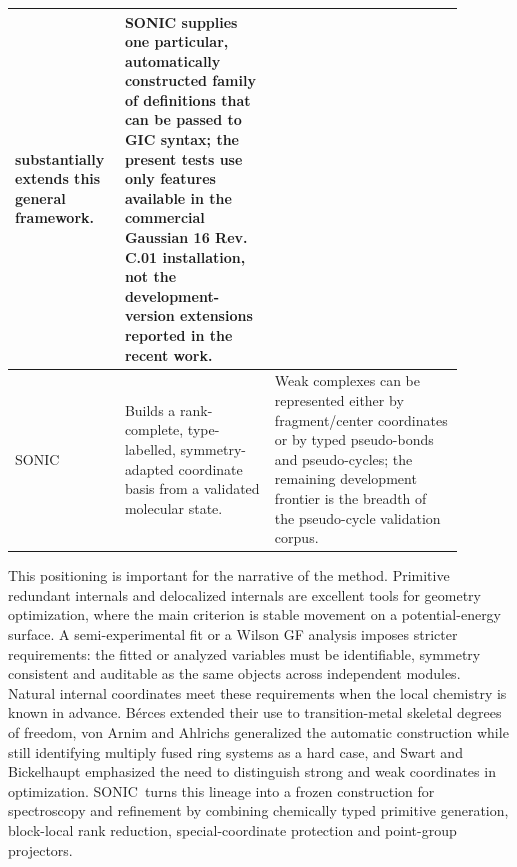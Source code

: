 \documentclass[journal=jctcce,manuscript=article,layout=traditional]{achemso}
\newcommand{\SONIC}{SONIC}
\theoremstyle{definition}
\begin{document}
\begin{table}[htbp]
\begin{tabular}{p{0.19\linewidth}p{0.31\linewidth}p{0.39\linewidth}}
substantially extends this general framework.\cite{Marenich2025GIC} & \SONIC{}
supplies one particular, automatically constructed family of definitions that
can be passed to GIC syntax; the present tests use only features available in
the commercial Gaussian 16 Rev. C.01 installation, not the development-version
extensions reported in the recent work. \\
\midrule
\SONIC & Builds a rank-complete, type-labelled, symmetry-adapted coordinate basis
from a validated molecular state. & Weak complexes can be represented either
by fragment/center coordinates or by typed pseudo-bonds and
pseudo-cycles; the remaining development frontier is the breadth of the
pseudo-cycle validation corpus. \\
\bottomrule
\end{tabular}
\end{table}

This positioning is important for the narrative of the method.  Primitive
redundant internals and delocalized internals are excellent tools for geometry
optimization, where the main criterion is stable movement on a potential-energy
surface.  A semi-experimental fit or a Wilson GF analysis imposes stricter
requirements: the fitted or analyzed variables must be identifiable, symmetry
consistent and auditable as the same objects across independent modules.
Natural internal coordinates meet these requirements when the local chemistry is
known in advance.  B{\'e}rces extended their use to transition-metal skeletal
degrees of freedom,\cite{Berces1997NaturalMetal} von Arnim and Ahlrichs
generalized the automatic construction while still identifying multiply fused
ring systems as a hard case,\cite{VonArnimAhlrichs1999GNIC} and Swart and
Bickelhaupt emphasized the need to distinguish strong and weak coordinates in
optimization.\cite{SwartBickelhaupt2006StrongWeak}  \SONIC\ turns this lineage
into a frozen construction for spectroscopy and refinement by combining
chemically typed primitive generation, block-local rank reduction,
special-coordinate protection and point-group projectors.
\end{document}
